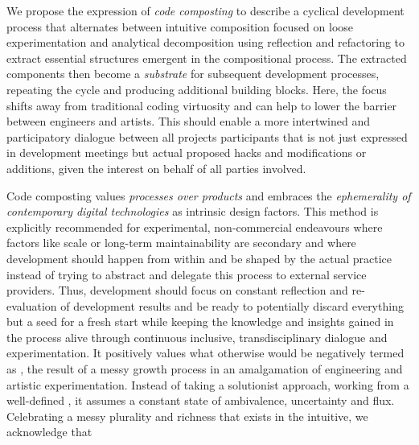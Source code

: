 We propose the expression of \emph{code composting} to describe a cyclical development process that alternates between intuitive composition focused on loose experimentation and analytical decomposition using reflection and refactoring to extract essential structures emergent in the compositional process.
The extracted components then become a \emph{substrate} for subsequent development processes, repeating the cycle and producing additional building blocks.
Here, the focus shifts away from traditional coding virtuosity and can help to lower the barrier between engineers and artists.
This should enable a more intertwined and participatory dialogue between all project\textquotesingle s participants that is not just expressed in development meetings but actual proposed hacks and modifications or additions, given the interest on behalf of all parties involved.

Code composting values \emph{processes over products} and embraces the \emph{ephemerality of contemporary digital technologies} as intrinsic design factors.
This method is explicitly recommended for experimental, non-commercial endeavours where factors like scale or long-term maintainability are secondary and where development should happen from within and be shaped by the actual practice instead of trying to abstract and delegate this process to external service providers.
Thus, development should focus on constant reflection and re-evaluation of development results and be ready to potentially discard everything but a seed for a fresh start while keeping the knowledge and insights gained in the process alive through continuous inclusive, transdisciplinary dialogue and experimentation.
It positively values what otherwise would be negatively termed as , the result of a messy growth process in an amalgamation of engineering and artistic experimentation.
Instead of taking a solutionist approach, working from a well-defined , it assumes a constant state of ambivalence, uncertainty and flux.
Celebrating a messy plurality and richness that exists in the intuitive, we acknowledge that \parencite[][55]{harawayStayingWithTheTrouble}
